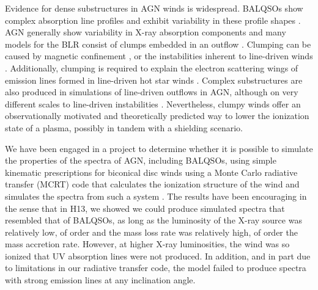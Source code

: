 \documentclass[useAMS,usenatbib]{mn2e_x}
\begin{document}
Evidence for dense substructures in AGN winds is widespread.
BALQSOs show complex absorption line profiles \citep{ganguly2006, simonhamann2010}
and exhibit variability in these profile shapes \citep{capellupo2011,capellupo2012,capellupo2014}.
AGN generally show variability in X-ray absorption components \citep[e.g.][]{risaliti2002}
and many models for the BLR consist of clumps embedded in an outflow 
\citep{krolik1981, emmering1992, dekool1995, cassidyraine1996}.
Clumping can be caused by magnetic confinement \citep{dekool1995},
or the instabilities inherent to line-driven winds 
\citep{lucysolomon1970,macgregor1979,carlberg1980,owockirybicki1984,owockirybicki1985}.
Additionally, clumping is required to explain the electron scattering wings of emission lines formed
in line-driven hot star winds \citep{hillier1991eswingsmodel}. Complex substructures 
are also produced in simulations of line-driven 
outflows in AGN, although on very different scales to line-driven instabilities 
\citep{PSK2000,PK04,progakurosawa2010,proga2014}.  
Nevertheless, clumpy winds offer an observationally motivated and theoretically 
predicted way to lower the ionization state of a plasma, possibly in tandem
with a shielding scenario. 

We have been engaged in a project to determine whether it is possible to simulate the properties of the spectra of AGN, including BALQSOs, using simple kinematic prescriptions for biconical disc winds using a Monte Carlo radiative transfer (MCRT) code that calculates the ionization structure of the wind and simulates the spectra from such a system \citep[][hereafter H13]{simlong2008,sim2010,higginbottom2013}.  The results have been encouraging in the sense that in H13, we showed we could produce simulated spectra that resembled that of BALQSOs, as long as the luminosity of the X-ray source was relatively low, of order  and the mass loss rate was relatively high, of order the mass accretion rate.  However, at higher X-ray luminosities, the wind was so ionized that UV absorption lines were not produced.  In addition, and in part due to limitations in our radiative transfer code, the model failed to produce spectra with strong emission lines at any inclination angle.  
\end{document}
